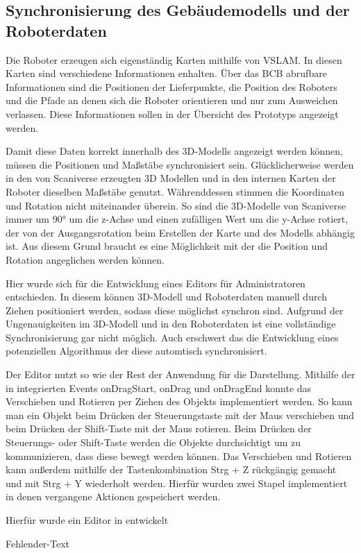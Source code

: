 \subsection{Synchronisierung des Gebäudemodells und der Roboterdaten}
Die Roboter erzeugen sich eigenständig Karten mithilfe von \ac{VSLAM}. In diesen Karten sind verschiedene Informationen enhalten. Über das \ac{BCB} abrufbare Informationen sind die Positionen der Lieferpunkte, die Position des Roboters und die Pfade an denen sich die Roboter orientieren und nur zum Ausweichen verlassen. Diese Informationen sollen in der Übersicht des Prototyps angezeigt werden.

Damit diese Daten korrekt innerhalb des 3D-Modells angezeigt werden können, müssen die Positionen und Maßstäbe synchronisiert sein. Glücklicherweise werden in den von Scaniverse erzeugten 3D Modellen und in den internen Karten der Roboter dieselben Maßstäbe genutzt. Währenddessen stimmen die Koordinaten und Rotation nicht miteinander überein. So sind die 3D-Modelle von Scaniverse immer um 90° um die z-Achse und einen zufälligen Wert um die y-Achse rotiert, der von der Ausgangsrotation beim Erstellen der Karte und des Modells abhängig ist. Aus diesem Grund braucht es eine Möglichkeit mit der die Position und Rotation angeglichen werden können. 

Hier wurde sich für die Entwicklung eines Editors für Administratoren entschieden. In diesem können 3D-Modell und Roboterdaten manuell durch Ziehen positioniert werden, sodass diese möglichst synchron sind. Aufgrund der Ungenauigkeiten im 3D-Modell und in den Roboterdaten ist eine vollständige Synchronisierung gar nicht möglich. Auch erschwert das die Entwicklung eines potenziellen Algorithmus der diese automtisch synchronisiert.

Der Editor nutzt so wie der Rest der Anwendung \deckgl für die Darstellung. Mithilfe der in \deckgl integrierten Events onDragStart, onDrag und onDragEnd konnte das Verschieben und Rotieren per Ziehen des Objekts implementiert werden. So kann man ein Objekt beim Drücken der Steuerungstaste mit der Maus verschieben und beim Drücken der Shift-Taste mit der Maus rotieren. Beim Drücken der Steuerungs- oder Shift-Taste werden die Objekte durchsichtigt um zu kommunizieren, dass diese bewegt werden können. Das Verschieben und Rotieren kann außerdem mithilfe der Tastenkombination Strg + Z rückgängig gemacht und mit Strg + Y wiederholt werden. Hierfür wurden zwei Stapel implementiert in denen vergangene Aktionen gespeichert werden.


Hierfür wurde ein Editor in \deckgl entwickelt 

Fehlender-Text

